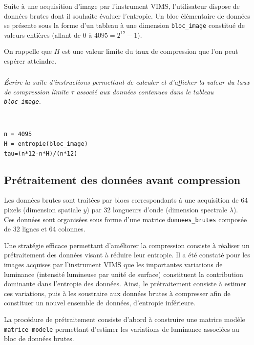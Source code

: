\documentclass[10pt,fleqn]{article} %
\begin{document}
Suite à une acquisition d’image par l’instrument VIMS, l’utilisateur dispose de données
brutes dont il souhaite évaluer l’entropie. Un bloc élémentaire de données se présente sous la
forme d’un tableau à une dimension \texttt{bloc\_image} constitué de valeurs entières (allant de 0 à
$4 095 = 2^{12} - 1$).

On rappelle que $H$ est une valeur limite du taux de compression que l'on peut espérer atteindre.

\subparagraph{}\textit{Écrire la suite d’instructions permettant de calculer et d’afficher la valeur du taux de
compression limite $\tau$ associé aux données contenues dans le tableau \texttt{bloc\_image}.}
\ifprof
\begin{corrige}~\\
\begin{lstlisting}
n = 4095
H = entropie(bloc_image)
tau=(n*12-n*H)/(n*12)
\end{lstlisting}
\end{corrige}
\else
\fi

\subsection{Prétraitement des données avant compression}

\ifprof
\else

Les données brutes sont traitées par blocs correspondants à une acquisition de 64 pixels
(dimension spatiale $y$) par 32 longueurs d’onde (dimension spectrale $\lambda$). Ces données sont
organisées sous forme d’une matrice \texttt{donnees\_brutes} composée de 32 lignes et 64 colonnes.


Une stratégie efficace permettant d’améliorer la compression consiste à réaliser un prétraitement
des données visant à réduire leur entropie. Il a été constaté pour les images acquises par
l’instrument VIMS que les importantes variations de luminance (intensité lumineuse par unité
de surface) constituent la contribution dominante dans l’entropie des données. Ainsi, le prétraitement
consiste à estimer ces variations, puis à les soustraire aux données brutes à compresser
afin de constituer un nouvel ensemble de données, d’entropie inférieure.

La procédure de prétraitement consiste d’abord à construire une matrice modèle
\texttt{matrice\_modele} permettant d’estimer les variations de luminance associées au bloc de données
brutes. 
\end{document}
